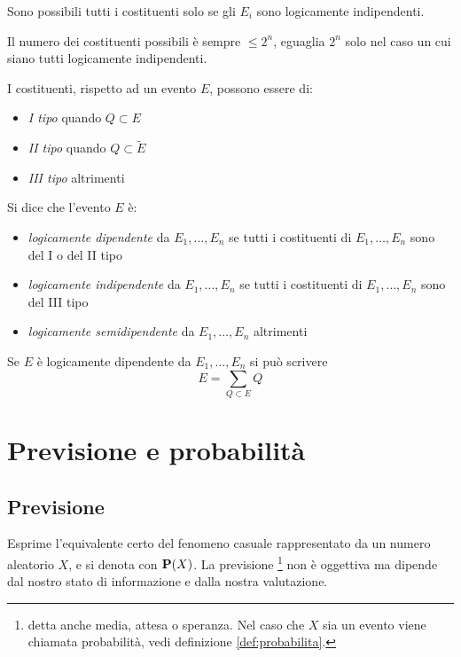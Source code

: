 Sono possibili tutti i costituenti solo se gli $E_i$ sono logicamente indipendenti.

Il numero dei costituenti possibili è sempre \( \leq 2^n \), eguaglia \( 2^n \) solo nel caso un cui siano tutti logicamente indipendenti.

\begin{definition}
  I costituenti, rispetto ad un evento $E$, possono essere di:
  \begin{itemize}
  \item \emph{I tipo} quando \( Q \subset E \)

  \item \emph{II tipo} quando \( Q \subset \tilde{E} \)

  \item \emph{III tipo} altrimenti
  \end{itemize}
\end{definition}

\begin{definition}
  Si dice che l'evento $E$ è:
  \begin{itemize}
  \item \emph{logicamente dipendente} da \( E_1, \ldots, E_n \) se tutti i costituenti di \( E_1, \ldots, E_n \) sono del I o del II tipo
  \item \emph{logicamente indipendente} da \( E_1, \ldots, E_n \) se tutti i costituenti di \( E_1, \ldots, E_n \) sono del III tipo
  \item \emph{logicamente semidipendente} da \( E_1, \ldots, E_n \) altrimenti
  \end{itemize}
\end{definition}

Se $E$ è logicamente dipendente da \( E_1, \ldots, E_n \) si può scrivere
\[ E = \sum_{Q \subset E} Q \]

\section{Previsione e probabilità}
\subsection{Previsione}
\begin{definition}[Previsione]
  Esprime l'equivalente certo del fenomeno casuale rappresentato da un numero aleatorio $X$, e si denota con $\mathbf{P}(X)$. La previsione
  \footnote{detta anche media, attesa o speranza.
  Nel caso che $X$ sia un evento viene chiamata probabilità, vedi definizione \ref{def:probabilita}.}
  non è oggettiva ma dipende dal nostro stato di informazione e dalla nostra valutazione.
\end{definition}

